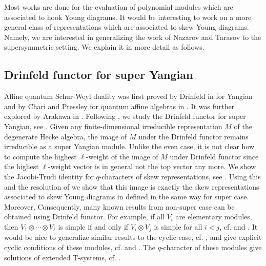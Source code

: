 \documentclass[11pt,reqno]{amsart}
\numberwithin{equation}{section}
\theoremstyle{definition}
\theoremstyle{remark}
\begin{document}
Most works are done for the evaluation of polynomial modules which are associated to hook Young diagrams. It would be interesting to work on a more general class of representations which are associated to skew Young diagrams. Namely, we are interested in generalizing the work of Nazarov and Tarasov \cite{NT:1998IMRN,NT:1998,NT:2002} to the supersymmetric setting. We explain it in more detail as follows.

\subsection{Drinfeld functor for super Yangian}
Affine quantum Schur-Weyl duality was first proved by Drinfeld in \cite{Dri:1986} for Yangian and by Chari and Pressley for quantum affine algebras in \cite{CP:1996}. It was further explored by Arakawa in \cite{Ara:1999}. Following \cite{Ara:1999}, we study the Drinfeld functor for super Yangian, see \cite[Sec. 4]{LM:2020}. Given any finite-dimensional irreducible representation $M$ of the degenerate Hecke algebra, the image of $M$ under the Drinfeld functor remains irreducible as a super Yangian module.  Unlike the even case, it is not clear how to compute the highest $\ell$-weight of the image of $M$ under Drinfeld functor since the highest $\ell$-weight vector is in general not the top vector any more. We show the Jacobi-Trudi identity for $q$-characters of skew representations, see \cite[Thm 3.4]{LM:2020}. Using this and the resolution of  we show that this image is exactly the skew representations associated to skew Young diagrams in \cite{NT:1998IMRN} defined in the same way for super case. Moreover, Consequently, many known results from non-super case can be obtained using Drinfeld functor. For example, if all $V_i$ are elementary modules, then $V_1\otimes \cdots\otimes V_\ell$ is simple if and only if $V_i\otimes V_j$ is simple for all $i<j$, cf. \cite[Theorem 4.9]{NT:2002} and \cite{Her:2010}. It would be nice to generalize similar results to the cyclic case, cf. \cite{Her:2019}, and give explicit cyclic conditions of these modules, cf. \cite[Proposition 3.1 and Theorem 3.3]{NT:1998IMRN} and \cite{Cha:2002}. The $q$-character of these modules give solutions of extended T-systems, cf. \cite{MY:2012}.
\end{document}
